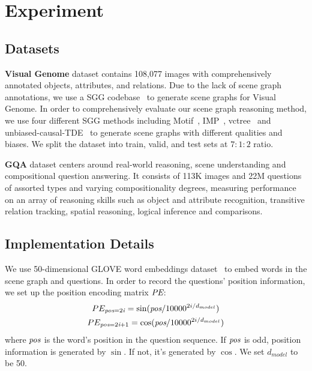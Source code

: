 \documentclass[letterpaper]{article} %
\begin{document}
\section{Experiment}\label{sec:experiments}
\subsection{Datasets}

\quad \textbf{Visual Genome} dataset contains 108,077 images with comprehensively annotated objects, attributes, and relations. Due to the lack of scene graph annotations, we use a SGG codebase~\cite{tang2020sggcode} to generate scene graphs for Visual Genome. In order to comprehensively evaluate our scene graph reasoning method, we use four different SGG methods including Motif~\cite{DBLP:conf/cvpr/ZellersYTC18}, IMP~\cite{DBLP:conf/cvpr/XuZCF17},  vctree~\cite{DBLP:conf/cvpr/TangZWLL19} and unbiased-causal-TDE~\cite{DBLP:conf/cvpr/TangNHSZ20} to generate scene graphs with different qualities and biases. We split the dataset into train, valid, and test sets at $7:1:2$ ratio.

\textbf{GQA} dataset centers around real-world reasoning, scene understanding and compositional question answering. It consists of 113K images and 22M questions of assorted types and varying compositionality degrees, measuring performance on an array of reasoning skills such as object and attribute recognition, transitive relation tracking, spatial reasoning, logical inference and comparisons.

\subsection{Implementation Details}

We use 50-dimensional GLOVE word embeddings dataset~\cite{pennington-etal-2014-glove} to embed words in the scene graph and questions. In order to record the questions' position information, we set up the position encoding matrix $\emph{PE}$:
\begin{gather}
    PE_{\emph{pos}=2\emph{i}} = \sin(\emph{pos}/10000^{2i/d_{model}})\\
    PE_{\emph{pos}=2\emph{i}+1} = \cos(\emph{pos}/10000^{2i/d_{model}})
\end{gather}
where $\emph{pos}$ is the word's position in the question sequence. If $\emph{pos}$ is odd, position information is generated by $\sin$. If not, it's generated by $\cos$. We set $d_{model}$ to be 50.
\end{document}
